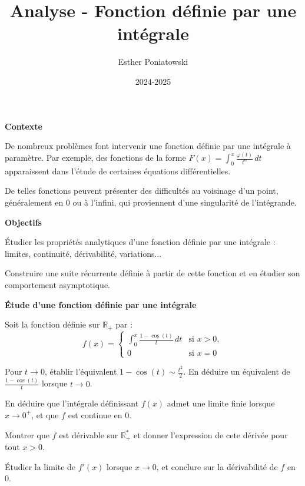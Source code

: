 \documentclass[10pt,a4paper]{article}
\title{Analyse - Fonction définie par une intégrale}
\author{Esther Poniatowski}
\date{2024-2025}
\begin{document}
\textbf{Contexte}

De nombreux problèmes font intervenir une fonction définie par une intégrale à paramètre. Par
exemple, des fonctions de la forme \( \displaystyle F(x) = \int_0^x \frac{\varphi(t)}{t^\alpha} \,
dt \) apparaissent dans l'étude de certaines équations différentielles.

De telles fonctions peuvent présenter des difficultés au voisinage d'un point, généralement en 0 ou
à l'infini, qui proviennent d'une singularité de l'intégrande.

\bigskip
\textbf{Objectifs}

Étudier les propriétés analytiques d'une fonction définie par une intégrale : limites, continuité,
dérivabilité, variations...

Construire une suite récurrente définie à partir de cette fonction et en étudier son comportement
asymptotique.

\bigskip

\textbf{Étude d'une fonction définie par une intégrale}

Soit la fonction définie sur \( \mathbb{R}_+ \) par :
\[
f(x) =
\begin{cases}
\displaystyle \int_0^x \frac{1 - \cos(t)}{t} \, dt & \text{si } x > 0, \\
0 & \text{si } x = 0
\end{cases}
\]

\q Pour \( t \to 0 \), établir l'équivalent \( 1 - \cos(t) \sim \frac{t^2}{2} \). En déduire un
équivalent de \( \frac{1 - \cos(t)}{t} \) lorsque \( t \to 0 \).

\q En déduire que l'intégrale définissant \( f(x) \) admet une limite finie lorsque \( x \to 0^+ \),
et que \( f \) est continue en \( 0 \).

\q Montrer que \( f \) est dérivable sur \( \mathbb{R}_+^* \) et donner l'expression de cete dérivée
pour tout \( x > 0 \).

Étudier la limite de \( f'(x) \) lorsque \( x \to 0 \), et conclure sur la dérivabilité de \( f \)
en \( 0 \).
\end{document}
